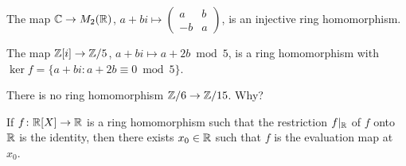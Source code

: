 \begin{example}
	The map $\mathbb{C}\to M_2(\mathbb{R})$, $a+bi\mapsto\begin{pmatrix}a&b\\-b&a\end{pmatrix}$, is an injective
	ring homomorphism. 	
\end{example}

\begin{example}
The map $\mathbb{Z}[i]\to\mathbb{Z}/5$, $a+bi\mapsto a+2b\bmod 5$, is a ring homomorphism 
with $\ker f=\{a+bi:a+2b\equiv 0\bmod 5\}$. 	
\end{example}

\begin{exercise}
\label{xca:Z6->Z15}
There is no ring homomorphism $\mathbb{Z}/6\to\mathbb{Z}/15$. Why?	
\end{exercise}

\begin{exercise}
If $f\colon\mathbb{R}[X]\to\mathbb{R}$ is a ring homomorphism 
such that the restriction $f|_{\mathbb{R}}$ of 
$f$ onto $\mathbb{R}$ is the identity, then there exists $x_0\in\mathbb{R}$ such that 
$f$ is the evaluation map at~$x_0$. 
\end{exercise}

